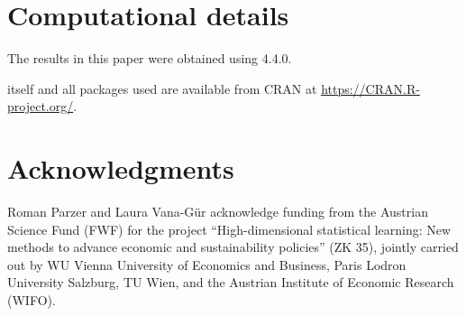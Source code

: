 \documentclass[
  article,
  nojss]{jss}
\begin{document}
\section*{Computational details}\label{computational-details}

The results in this paper were obtained using  4.4.0.

 itself and all packages used are available from CRAN at
\url{https://CRAN.R-project.org/}.

\section*{Acknowledgments}\label{acknowledgments}

Roman Parzer and Laura Vana-Gür acknowledge funding from the Austrian
Science Fund (FWF) for the project ``High-dimensional statistical
learning: New methods to advance economic and sustainability policies''
(ZK 35), jointly carried out by WU Vienna University of Economics and
Business, Paris Lodron University Salzburg, TU Wien, and the Austrian
Institute of Economic Research (WIFO).


\renewcommand\refname{References}
  
\end{document}
